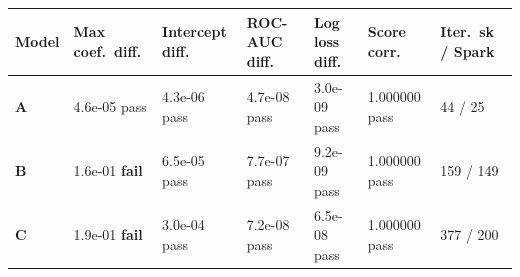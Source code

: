 \begin{tabular}{@{}lllllll@{}}
\toprule
Model & Max coef.\ diff. & Intercept diff. & ROC-AUC diff. & Log loss diff. & Score corr. & Iter.\ sk / Spark \\
\midrule
\textbf{A} & 4.6e-05 \textcolor{okgreen}{pass} & 4.3e-06 \textcolor{okgreen}{pass} & 4.7e-08 \textcolor{okgreen}{pass} & 3.0e-09 \textcolor{okgreen}{pass} & 1.000000 \textcolor{okgreen}{pass} & 44 / 25 \\
\textbf{B} & 1.6e-01 \textcolor{badred}{\textbf{fail}} & 6.5e-05 \textcolor{okgreen}{pass} & 7.7e-07 \textcolor{okgreen}{pass} & 9.2e-09 \textcolor{okgreen}{pass} & 1.000000 \textcolor{okgreen}{pass} & 159 / 149 \\
\textbf{C} & 1.9e-01 \textcolor{badred}{\textbf{fail}} & 3.0e-04 \textcolor{okgreen}{pass} & 7.2e-08 \textcolor{okgreen}{pass} & 6.5e-08 \textcolor{okgreen}{pass} & 1.000000 \textcolor{okgreen}{pass} & 377 / 200 \\
\bottomrule
\end{tabular}
